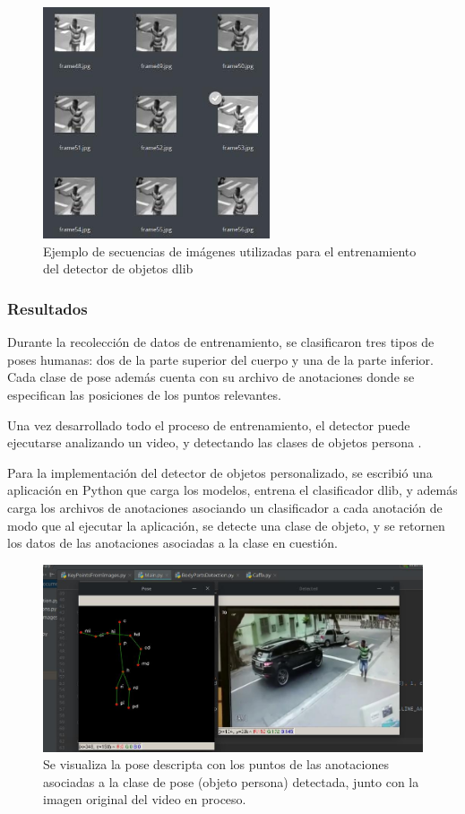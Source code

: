 \documentclass[a4paper,12pt,oneside,spanish]{book}
\begin{document}
\begin{itemize}
	\begin{figure}[h!]
		\includegraphics[width=190pt]{Imagenes/dataset1.jpg}
		\centering
		\caption{Ejemplo de secuencias de imágenes utilizadas para el entrenamiento del detector de objetos dlib}
		\label{fig:dataset1}
	\end{figure}
\end{itemize}

\subsubsection{Resultados}
Durante la recolección de datos de entrenamiento, se clasificaron tres tipos de poses humanas: dos de la parte superior del cuerpo y una de la parte inferior. Cada clase de pose además cuenta con su archivo de anotaciones donde se especifican las posiciones de los puntos relevantes.\par

Una vez desarrollado todo el proceso de entrenamiento, el detector puede ejecutarse analizando un video, y detectando las clases de objetos persona .\par

Para la implementación del detector de objetos personalizado, se escribió una aplicación en Python que carga los modelos, entrena el clasificador dlib, y además carga los archivos de anotaciones asociando un clasificador a cada anotación de modo que al ejecutar la aplicación, se detecte una clase de objeto, y se retornen los datos de las anotaciones asociadas a la clase en cuestión.\par

\begin{figure}[h!]
	\includegraphics[width=330pt]{Imagenes/results1.jpg}
	\centering	
	\caption{Se visualiza la pose descripta con los puntos de las anotaciones asociadas a la clase de pose (objeto persona) detectada, junto con la imagen original del video en proceso.}
	\label{fig:results1}
\end{figure}	
\end{document}
